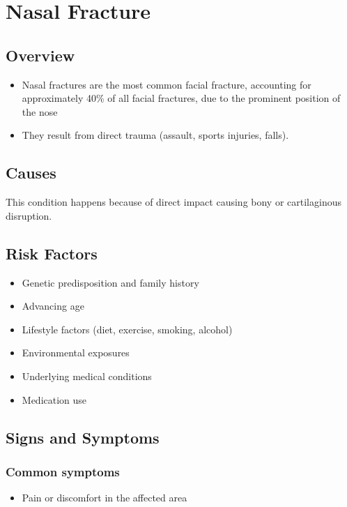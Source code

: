 \chapter{Nasal Fracture}
\label{sec:Nasal Fracture}

\section{Overview}


\begin{itemize}[noitemsep]
  \item Nasal fractures are the most common facial fracture, accounting for approximately 40\% of all facial fractures, due to the prominent position of the nose
  \item They result from direct trauma (assault, sports injuries, falls).
\end{itemize}
\section{Causes}
This condition happens because of direct impact causing bony or cartilaginous disruption.     
\section{Risk Factors}

\begin{itemize}[noitemsep]
  \item Genetic predisposition and family history
  \item Advancing age
  \item Lifestyle factors (diet, exercise, smoking, alcohol)
  \item Environmental exposures
  \item Underlying medical conditions
  \item Medication use
\end{itemize}
\section{Signs and Symptoms}

\subsection{Common symptoms}
\begin{itemize}[noitemsep]
  \item Pain or discomfort in the affected area
  \end{itemize}

